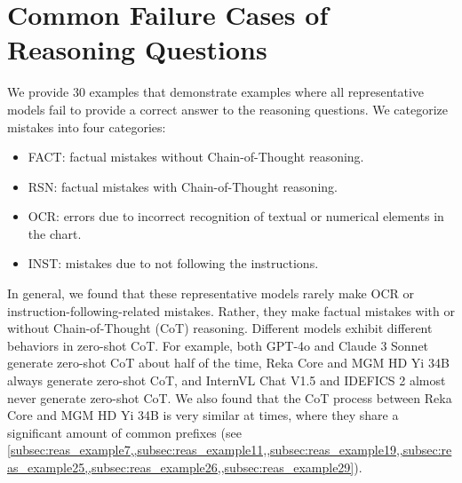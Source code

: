 \newpage
\section{Common Failure Cases of Reasoning Questions}
\label{sec:reas:failure}

We provide 30 examples that demonstrate examples where all representative models fail to provide a correct answer to the reasoning questions. We categorize mistakes into four categories:
\vspace{-1.5ex}
\begin{itemize}
    \item FACT: factual mistakes without Chain-of-Thought reasoning.
    \item RSN: factual mistakes with Chain-of-Thought reasoning.
    \item OCR: errors due to incorrect recognition of textual or numerical elements in the chart.
    \item INST: mistakes due to not following the instructions.
\end{itemize}
\vspace{-1.5ex}
In general, we found that these representative models rarely make OCR or instruction-following-related mistakes. Rather, they make factual mistakes with or without Chain-of-Thought (CoT) reasoning. Different models exhibit different behaviors in zero-shot CoT. For example, both GPT-4o and Claude 3 Sonnet generate zero-shot CoT about half of the time, Reka Core and MGM HD Yi 34B always generate zero-shot CoT, and InternVL Chat V1.5 and IDEFICS 2 almost never generate zero-shot CoT. We also found that the CoT process between Reka Core and MGM HD Yi 34B is very similar at times, where they share a significant amount of common prefixes (see \cref{subsec:reas_example7,,subsec:reas_example11,,subsec:reas_example19,,subsec:reas_example25,,subsec:reas_example26,,subsec:reas_example29}).


